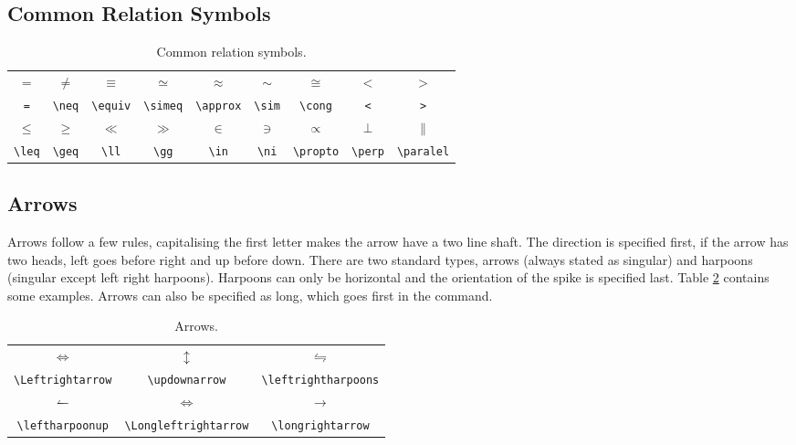 \subsection{Common Relation Symbols}
%
\begin{table}[!htbp]
    \centering
    \caption{Common relation symbols.}
    \label{t:rs}
    \begin{tabular}{ccccccccc}
        $=$ & $\neq$ & $\equiv$ & $\simeq$ & $\approx$ & $\sim$ & $\cong$ & $<$ & $>$\\
        \verb|=| & \verb|\neq| & \verb|\equiv| & \verb|\simeq| & \verb|\approx| & \verb|\sim| & \verb|\cong| & \verb|<| & \verb|>| \\
        $\leq$ & $\geq$ & $\ll$ & $\gg$ & $\in$ & $\ni$ & $\propto$ & $\perp$ & $\parallel$\\
        \verb|\leq| & \verb|\geq| & \verb|\ll| & \verb|\gg| & \verb|\in| & \verb|\ni| & \verb|\propto| & \verb|\perp| & \verb|\paralel|\\
    \end{tabular}
\end{table}
%
\subsection{Arrows}
%
Arrows follow a few rules, capitalising the first letter makes the arrow have a two line shaft. The direction is specified first, if the arrow has two heads, left goes before right and up before down. There are two standard types, arrows (always stated as singular) and harpoons (singular except left right harpoons). Harpoons can only be horizontal and the orientation of the spike is specified last. Table \ref{t:arr} contains some examples. Arrows can also be specified as long, which goes first in the command.
\begin{table}[!htbp]
    \centering
    \caption{Arrows.}
    \label{t:arr}
    \begin{tabular}{ccc}
        $\Leftrightarrow$ & $\updownarrow$ & $\leftrightharpoons$ \\
        \verb|\Leftrightarrow| & \verb|\updownarrow| & \verb|\leftrightharpoons| \\
        $\leftharpoonup$ & $\Longleftrightarrow$	& $\longrightarrow$\\
        \verb|\leftharpoonup| & \verb|\Longleftrightarrow| & \verb|\longrightarrow|
    \end{tabular}
\end{table}
%
